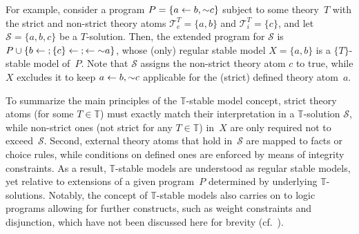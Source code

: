 For example, consider a program $P=\{a\leftarrow b,{\sim}{c}\}$ subject to
some theory~$T$ with the strict and non-strict theory atoms
$\mathcal{T}^T_e=\{a,b\}$ and $\mathcal{T}^T_i=\{c\}$,
and let $\mathcal{S}=\{a,b,c\}$ be a $T$-solution.
Then, the extended program for $\mathcal{S}$ is
$P\cup\{{b\leftarrow{}}; {\{c\}\leftarrow{}};  \leftarrow{\sim}{a}\}$,
whose (only) regular stable model $X=\{a,b\}$ is a $\{T\}$-stable model of~$P$.
Note that $\mathcal{S}$ assigns the non-strict theory atom $c$ to true,
while $X$ excludes it to keep
$a\leftarrow b,{\sim}{c}$ applicable
for the (strict) defined theory atom~$a$.

To summarize the main principles of the $\mathbb{T}$-stable model concept,
strict theory atoms (for some $T\in\mathbb{T}$) must exactly match their
interpretation in a $\mathbb{T}$-solution $\mathcal{S}$,
while non-strict ones (not strict for any $T\in\mathbb{T}$) in~$X$ are only required not to exceed~$\mathcal{S}$.
Second,
external theory atoms that hold in~$\mathcal{S}$ are mapped to facts or choice rules,
while conditions on defined ones are enforced by means of integrity constraints.
As a result, $\mathbb{T}$-stable models are understood as regular stable models,
yet relative to extensions of a given program~$P$
determined by underlying $\mathbb{T}$-solutions.
Notably, %
the concept of $\mathbb{T}$-stable models also carries on to logic programs allowing for
further constructs, such as weight constraints and disjunction,
which have not been discussed here for brevity (cf.~\cite{siniso02a}).

